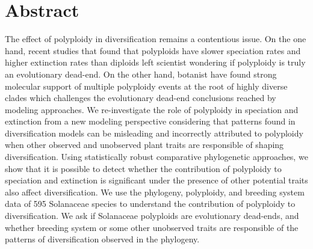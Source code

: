 \section{Abstract}

The effect of polyploidy in diversification remains a contentious issue. On the one hand,  recent studies  that found that polyploids have slower speciation rates and higher extinction rates than diploids left scientist wondering if polyploidy is truly an evolutionary dead-end. On the other hand, botanist have found strong molecular support of multiple polyploidy events at the root of highly diverse clades which challenges the evolutionary dead-end conclusions reached by modeling approaches. We re-investigate the role of polyploidy in speciation and extinction from a new modeling perspective considering that patterns found in diversification models can be misleading and incorrectly attributed to polyploidy when other observed and unobserved plant traits are responsible of shaping diversification.  Using  statistically robust comparative phylogenetic approaches, we show that it is possible to  detect whether  the contribution of polyploidy to speciation and extinction is significant  under the presence of  other potential traits also affect diversification. We use the phylogeny, polyploidy, and breeding system data of 595 Solanaceae species to understand the contribution of polyploidy to diversification. We ask if Solanaceae polyploids are evolutionary dead-ends, and whether breeding system or some other unobserved traits are responsible of the patterns of diversification observed in the phylogeny.